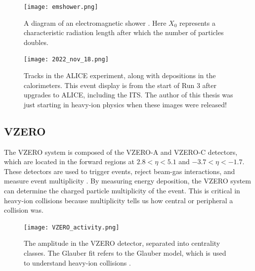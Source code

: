 \documentclass[../main.tex]{subfiles}
\begin{document}
\begin{figure}[h]
    \centering
    \texttt{[image: emshower.png]}
    \caption{A diagram of an electromagnetic shower \cite{Thomson:particle}. Here $X_0$ represents a characteristic radiation length after which the number of particles doubles.}
    \label{fig:em_shower}
\end{figure}


\begin{figure}[h]
    \centering
    \texttt{[image: 2022\_nov\_18.png]}
    \caption{Tracks in the ALICE experiment, along with depositions in the calorimeters. This event display is from the start of Run 3 after upgrades to ALICE, including the ITS. The author of this thesis was just starting in heavy-ion physics when these images were released!}
\end{figure}


\subsection{VZERO}
The VZERO system is composed of the VZERO-A and VZERO-C detectors, which are located in the forward regions at $2.8<\eta<5.1$ and $-3.7<\eta<-1.7$. These detectors are used to trigger events, reject beam-gas interactions, and measure event multiplicity \cite{ALICE:2013axi}. By measuring energy deposition, the VZERO system can determine the charged particle multiplicity of the event. This is critical in heavy-ion collisions because multiplicity tells us how central or peripheral a collision was.  

\begin{figure}[h]
    \centering
    \texttt{[image: VZERO\_activity.png]}
    \caption{The amplitude in the VZERO detector, separated into centrality classes. The Glauber fit refers to the Glauber model, which is used to understand heavy-ion collisions \cite{Florkowski:pheno}.}
\end{figure}


\ifSubfilesClassLoaded{%
    \printbibliography
}
\end{document}
